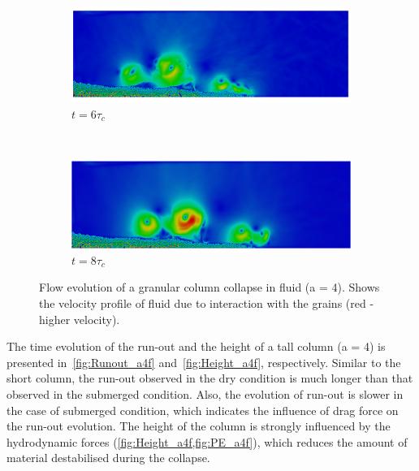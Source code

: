 \begin{figure}
\ContinuedFloat
\begin{subfigure}[b]{0.975\textwidth}
	\centering
    \includegraphics[width=\textwidth]{a4/a4_6tc}
    \caption*{$t = 6\tau_c$}
    \label{fig:a4_6tc}
\end{subfigure}
\\
\begin{subfigure}[b]{0.975\textwidth}
	\centering
    \includegraphics[width=\textwidth]{a4/a4_8tc}
    \caption*{$t = 8\tau_c$}
    \label{fig:a4_8tc}
\end{subfigure}

\caption{Flow evolution of a granular column collapse in fluid (a = 4). Shows 
the velocity profile of fluid due to interaction with the grains (red - higher 
velocity).}
\label{fig:a4_snapshots}
\end{figure}

The time evolution of the run-out and the height of a tall column (a = 4) is 
presented in~\cref{fig:Runout_a4f} and~\cref{fig:Height_a4f}, respectively. 
Similar to the short column, the run-out observed in the dry condition is much 
longer than that observed in the submerged condition. Also, the evolution of 
run-out is slower in the case of submerged condition, which indicates the 
influence of drag force on the run-out evolution. The height of the column is 
strongly influenced by the hydrodynamic forces 
(\cref{fig:Height_a4f,fig:PE_a4f}), which reduces the amount of material 
destabilised during the collapse.  

